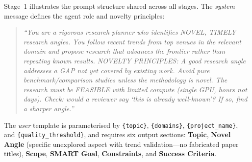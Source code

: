 \begin{tcolorbox}[
  title={Stage~1 Deep Dive: \textsc{Topic\_Init}},
  colback=blue!3!white,
  colframe=blue!50!black,
  fonttitle=\bfseries\small,
  breakable,
  label={box:stage1-prompt},
]
Stage~1 illustrates the prompt structure shared across all stages.
The \emph{system} message defines the agent role and novelty principles:

\smallskip
\begin{quote}\small\itshape
``You are a rigorous research planner who identifies NOVEL, TIMELY research angles.
You follow recent trends from top venues in the relevant domain and propose research that advances the frontier rather than repeating known results.
NOVELTY PRINCIPLES: A good research angle addresses a GAP not yet covered by existing work.
Avoid pure benchmark/comparison studies unless the methodology is novel.
The research must be FEASIBLE with limited compute (single GPU, hours not days).
Check: would a reviewer say `this is already well-known'? If so, find a sharper angle.''
\end{quote}
\smallskip

The \emph{user} template is parameterised by \texttt{\{topic\}}, \texttt{\{domains\}}, \texttt{\{project\_name\}}, and \texttt{\{quality\_threshold\}}, and requires six output sections:
\textbf{Topic}, \textbf{Novel Angle} (specific unexplored aspect with trend validation---no fabricated paper titles), \textbf{Scope}, \textbf{SMART Goal}, \textbf{Constraints}, and \textbf{Success Criteria}.
\end{tcolorbox}

